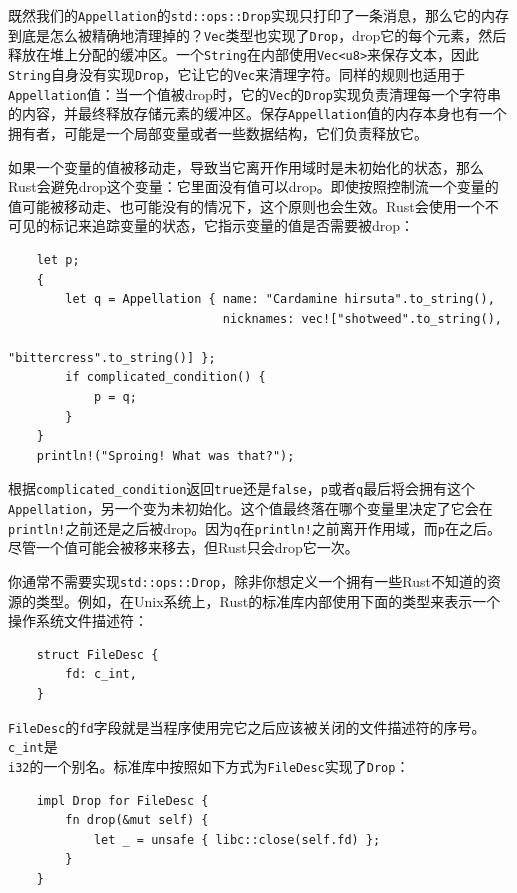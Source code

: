 既然我们的\texttt{Appellation}的\texttt{std::ops::Drop}实现只打印了一条消息，那么它的内存到底是怎么被精确地清理掉的？\texttt{Vec}类型也实现了\texttt{Drop}，drop它的每个元素，然后释放在堆上分配的缓冲区。一个\texttt{String}在内部使用\texttt{Vec<u8>}来保存文本，因此\texttt{String}自身没有实现\texttt{Drop}，它让它的\texttt{Vec}来清理字符。同样的规则也适用于\texttt{Appellation}值：当一个值被drop时，它的\texttt{Vec}的\texttt{Drop}实现负责清理每一个字符串的内容，并最终释放存储元素的缓冲区。保存\texttt{Appellation}值的内存本身也有一个拥有者，可能是一个局部变量或者一些数据结构，它们负责释放它。

如果一个变量的值被移动走，导致当它离开作用域时是未初始化的状态，那么Rust会避免drop这个变量：它里面没有值可以drop。即使按照控制流一个变量的值可能被移动走、也可能没有的情况下，这个原则也会生效。Rust会使用一个不可见的标记来追踪变量的状态，它指示变量的值是否需要被drop：
\begin{verbatim}
    let p;
    {
        let q = Appellation { name: "Cardamine hirsuta".to_string(),
                              nicknames: vec!["shotweed".to_string(),
                                              "bittercress".to_string()] };
        if complicated_condition() {
            p = q;
        }
    }
    println!("Sproing! What was that?");
\end{verbatim}

根据\texttt{complicated\_condition}返回\texttt{true}还是\texttt{false}，\texttt{p}或者\texttt{q}最后将会拥有这个\\
\texttt{Appellation}，另一个变为未初始化。这个值最终落在哪个变量里决定了它会在\texttt{println!}之前还是之后被drop。因为\texttt{q}在\texttt{println!}之前离开作用域，而\texttt{p}在之后。尽管一个值可能会被移来移去，但Rust只会drop它一次。

你通常不需要实现\texttt{std::ops::Drop}，除非你想定义一个拥有一些Rust不知道的资源的类型。例如，在Unix系统上，Rust的标准库内部使用下面的类型来表示一个操作系统文件描述符：
\begin{verbatim}
    struct FileDesc {
        fd: c_int,
    }
\end{verbatim}

\texttt{FileDesc}的\texttt{fd}字段就是当程序使用完它之后应该被关闭的文件描述符的序号。\texttt{c\_int}是\\
\texttt{i32}的一个别名。标准库中按照如下方式为\texttt{FileDesc}实现了\texttt{Drop}：
\begin{verbatim}
    impl Drop for FileDesc {
        fn drop(&mut self) {
            let _ = unsafe { libc::close(self.fd) };
        }
    }
\end{verbatim}

